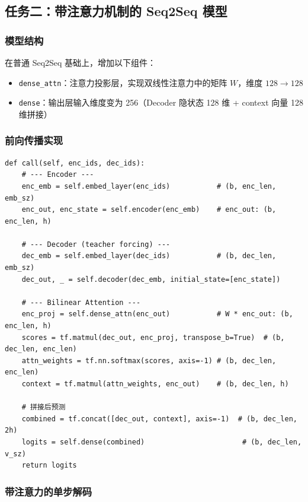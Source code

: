 \documentclass[12pt, a4paper]{article}
\begin{document}
\subsection{任务二：带注意力机制的 Seq2Seq 模型}

\subsubsection{模型结构}

在普通 Seq2Seq 基础上，增加以下组件：

\begin{itemize}
    \item \texttt{dense\_attn}：注意力投影层，实现双线性注意力中的矩阵 $W$，维度 $128 \to 128$
    \item \texttt{dense}：输出层输入维度变为 256（Decoder 隐状态 128 维 + context 向量 128 维拼接）
\end{itemize}

\subsubsection{前向传播实现}

\begin{lstlisting}[caption={Attentive Seq2Seq 模型 call 方法}]
def call(self, enc_ids, dec_ids):
    # --- Encoder ---
    enc_emb = self.embed_layer(enc_ids)           # (b, enc_len, emb_sz)
    enc_out, enc_state = self.encoder(enc_emb)    # enc_out: (b, enc_len, h)

    # --- Decoder (teacher forcing) ---
    dec_emb = self.embed_layer(dec_ids)           # (b, dec_len, emb_sz)
    dec_out, _ = self.decoder(dec_emb, initial_state=[enc_state])

    # --- Bilinear Attention ---
    enc_proj = self.dense_attn(enc_out)           # W * enc_out: (b, enc_len, h)
    scores = tf.matmul(dec_out, enc_proj, transpose_b=True)  # (b, dec_len, enc_len)
    attn_weights = tf.nn.softmax(scores, axis=-1) # (b, dec_len, enc_len)
    context = tf.matmul(attn_weights, enc_out)    # (b, dec_len, h)

    # 拼接后预测
    combined = tf.concat([dec_out, context], axis=-1)  # (b, dec_len, 2h)
    logits = self.dense(combined)                       # (b, dec_len, v_sz)
    return logits
\end{lstlisting}

\subsubsection{带注意力的单步解码}
\end{document}
